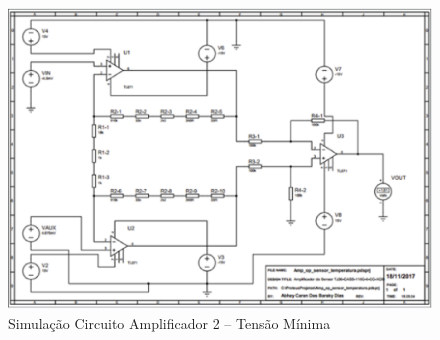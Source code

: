 \begin{figure}[!htb]                  
	\centering                          
	\includegraphics[scale=0.45]{figuras/circ3.eps}
	\caption{ Simulação Circuito Amplificador 2 – Tensão Mínima }             
\end{figure}

